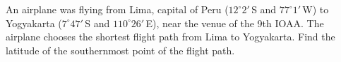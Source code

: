 An airplane was flying from Lima, capital of Peru ($12^\circ 2'$\,S and
$77^\circ 1'$\,W) to Yogyakarta ($7^\circ 47'$\,S and $110^\circ 26'$\,E),
near the venue of the 9th IOAA. The airplane chooses the shortest flight path
from Lima to Yogyakarta. Find the latitude of the southernmost point of the
flight path.

